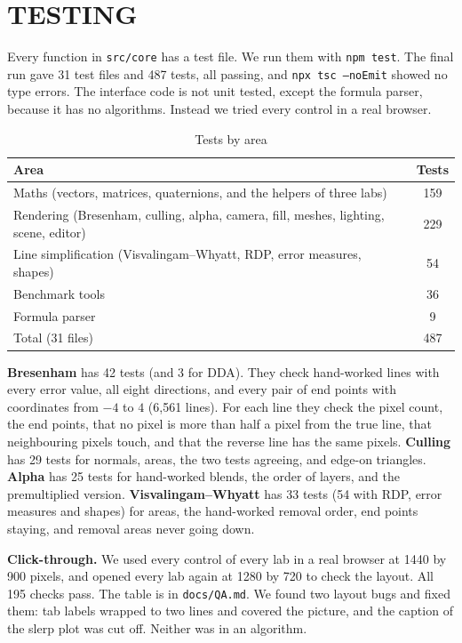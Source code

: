 \chapter{TESTING}\nonum

Every function in \texttt{src/core} has a test file. We run them with \texttt{npm test}. The final run gave 31 test files and 487 tests, all passing, and \texttt{npx tsc --noEmit} showed no type errors. The interface code is not unit tested, except the formula parser, because it has no algorithms. Instead we tried every control in a real browser.

\begin{table}[H]
\centering
\caption{Tests by area}
\label{tab:tests}
\small
\begin{tabular}{@{}lc@{}}
\toprule
Area & Tests\\
\midrule
Maths (vectors, matrices, quaternions, and the helpers of three labs) & 159\\
Rendering (Bresenham, culling, alpha, camera, fill, meshes, lighting, scene, editor) & 229\\
Line simplification (Visvalingam--Whyatt, RDP, error measures, shapes) & 54\\
Benchmark tools & 36\\
Formula parser & 9\\
\midrule
Total (31 files) & 487\\
\bottomrule
\end{tabular}
\end{table}

\textbf{Bresenham} has 42 tests (and 3 for DDA). They check hand-worked lines with every error value, all eight directions, and every pair of end points with coordinates from $-4$ to $4$ (6,561 lines). For each line they check the pixel count, the end points, that no pixel is more than half a pixel from the true line, that neighbouring pixels touch, and that the reverse line has the same pixels. \textbf{Culling} has 29 tests for normals, areas, the two tests agreeing, and edge-on triangles. \textbf{Alpha} has 25 tests for hand-worked blends, the order of layers, and the premultiplied version. \textbf{Visvalingam--Whyatt} has 33 tests (54 with RDP, error measures and shapes) for areas, the hand-worked removal order, end points staying, and removal areas never going down.

\textbf{Click-through.} We used every control of every lab in a real browser at 1440 by 900 pixels, and opened every lab again at 1280 by 720 to check the layout. All 195 checks pass. The table is in \texttt{docs/QA.md}. We found two layout bugs and fixed them: tab labels wrapped to two lines and covered the picture, and the caption of the slerp plot was cut off. Neither was in an algorithm.
